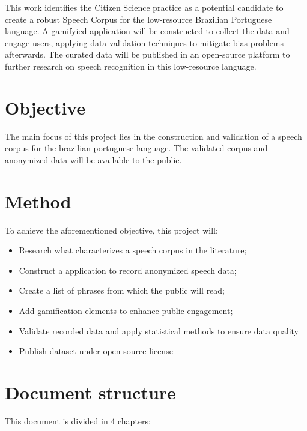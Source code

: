 This work identifies the Citizen Science practice as a potential candidate to create a robust Speech Corpus for the low-resource Brazilian Portuguese language. A gamifyied application will be constructed to collect the data and engage users, applying data validation techniques to mitigate bias problems afterwards. The curated data will be published in an open-source platform to further research on speech recognition in this low-resource language.

\section*{Objective}

The main focus of this project lies in the construction and validation of a speech corpus for the brazilian portuguese language. The validated corpus and anonymized data will be available to the public.

\section*{Method}

To achieve the aforementioned objective, this project will:

\begin{itemize}
    \item Research what characterizes a speech corpus in the literature;
    \item Construct a application to record anonymized speech data;
    \item Create a list of phrases from which the public will read;
    \item Add gamification elements to enhance public engagement;
    \item Validate recorded data and apply statistical methods to ensure data quality
    \item Publish dataset under open-source license
\end{itemize}

\section*{Document structure}

This document is divided in 4 chapters:

